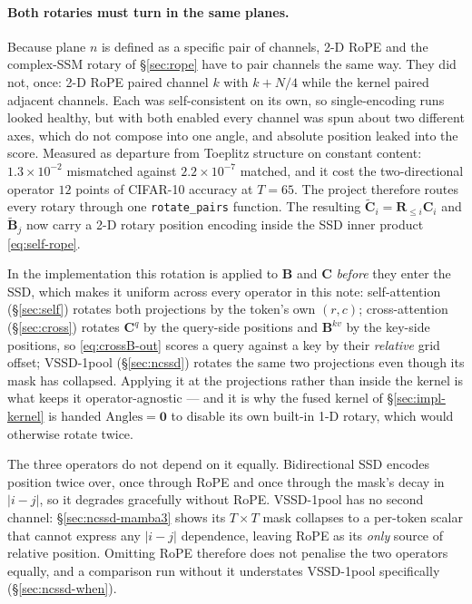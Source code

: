 \documentclass[11pt,a4paper]{article}
\begin{document}
\paragraph{Both rotaries must turn in the same planes.}
Because plane $n$ is defined as a specific pair of channels, 2-D RoPE and the
complex-SSM rotary of \S\ref{sec:rope} have to pair channels the same way. They
did not, once: 2-D RoPE paired channel $k$ with $k+N/4$ while the kernel paired
adjacent channels. Each was self-consistent on its own, so single-encoding runs
looked healthy, but with both enabled every channel was spun about two different
axes, which do not compose into one angle, and absolute position leaked into the
score. Measured as departure from Toeplitz structure on constant content:
$1.3\times10^{-2}$ mismatched against $2.2\times10^{-7}$ matched, and it cost the
two-directional operator $12$ points of CIFAR-10 accuracy at $T{=}65$. The
project therefore routes every rotary through one \texttt{rotate\_pairs}
function. The resulting
$\widetilde{\bm{C}}_i = \bm{R}_{\le i}\bm{C}_i$ and
$\widetilde{\bm{B}}_j$ now carry a 2-D rotary position encoding
inside the SSD inner product \eqref{eq:self-rope}.

In the implementation this rotation is applied to $\bm{B}$ and $\bm{C}$
\emph{before} they enter the SSD, which makes it uniform across every operator
in this note: self-attention (\S\ref{sec:self}) rotates both projections by the
token's own $(r,c)$; cross-attention (\S\ref{sec:cross}) rotates $\bm{C}^q$ by
the query-side positions and $\bm{B}^{kv}$ by the key-side positions, so
\eqref{eq:crossB-out} scores a query against a key by their \emph{relative}
grid offset; VSSD-1pool (\S\ref{sec:ncssd}) rotates the same two projections even
though its mask has collapsed. Applying it at the projections rather than inside
the kernel is what keeps it operator-agnostic --- and it is why the fused kernel
of \S\ref{sec:impl-kernel} is handed $\text{Angles}=\bm{0}$ to disable its own
built-in 1-D rotary, which would otherwise rotate twice.

The three operators do not depend on it equally. Bidirectional SSD encodes
position twice over, once through RoPE and once through the mask's decay in
$|i-j|$, so it degrades gracefully without RoPE. VSSD-1pool has no second channel:
\S\ref{sec:ncssd-mamba3} shows its $T\times T$ mask collapses to a per-token
scalar that cannot express any $|i-j|$ dependence, leaving RoPE as its
\emph{only} source of relative position. Omitting RoPE therefore does not
penalise the two operators equally, and a comparison run without it understates
VSSD-1pool specifically (\S\ref{sec:ncssd-when}).
\end{document}
